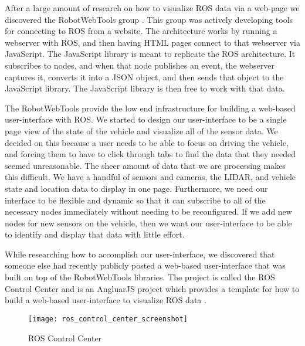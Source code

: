 After a large amount of research on how to visualize ROS data via a web-page we discovered the RobotWebTools group \cite{robotwebtools}. This group was actively developing tools for connecting to ROS from a website.  The architecture works by running a webserver with ROS, and then having HTML pages connect to that webserver via JavaScript.  The JavaScript library is meant to replicate the ROS architecture.  It subscribes to nodes, and when that node publishes an event, the webserver captures it, converts it into a JSON object, and then sends that object to the JavaScript library.  The JavaScript library is then free to work with that data.

The RobotWebTools provide the low end infrastructure for building a web-based user-interface with ROS.  We started to design our user-interface to be a single page view of the state of the vehicle and visualize all of the sensor data.  We decided on this because a user needs to be able to focus on driving the vehicle, and forcing them to have to click through tabs to find the data that they needed seemed unreasonable.  The sheer amount of data that we are processing makes this difficult.  We have a handful of sensors and cameras, the LIDAR, and vehicle state and location data to display in one page.  Furthermore, we need our interface to be flexible and dynamic so that it can subscribe to all of the necessary nodes immediately without needing to be reconfigured.  If we add new nodes for new sensors on the vehicle, then we want our user-interface to be able to identify and display that data with little effort.

While researching how to accomplish our user-interface, we discovered that someone else had recently publicly posted a web-based user-interface that was built on top of the RobotWebTools libraries.  The project is called the ROS Control Center and is an AngluarJS project which provides a template for how to build a web-based user-interface to visualize ROS data \cite{roscontrolcenter}.

\begin{figure}[H]
\centerline{\texttt{[image: ros\_control\_center\_screenshot]}}
\caption[]{ROS Control Center}
\label{fig:roscontrolcenter}
\end{figure}

